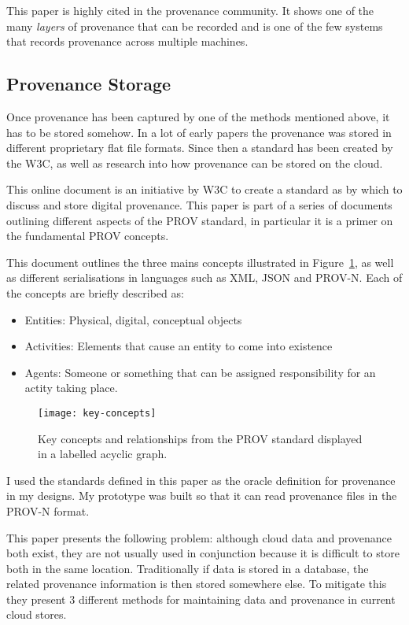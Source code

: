This paper is highly cited in the provenance community. It shows one of the many \textit{layers} of provenance that can be recorded and is one of the few systems that records provenance across multiple machines. 

\subsection{Provenance Storage}
\label{sec:provenance_storage}

Once provenance has been captured by one of the methods mentioned above, it has to be stored somehow. In a lot of early papers the provenance was stored in different proprietary flat file formats. Since then a standard has been created by the W3C, as well as research into how provenance can be stored on the cloud.

This online document is an initiative by W3C to create a standard as by which to discuss and store digital provenance. This paper is part of a series of documents outlining different aspects of the PROV standard, in particular it is a primer on the fundamental PROV concepts.

This document outlines the three mains concepts illustrated in Figure~\ref{fig:key-concepts}, as well as different serialisations in languages such as XML, JSON and PROV-N. Each of the concepts are briefly described as:
\begin{itemize}
	\item Entities: Physical, digital, conceptual objects
	\item Activities: Elements that cause an entity to come into existence
	\item Agents: Someone or something that can be assigned responsibility for an actity taking place.  
\end{itemize}

\begin{figure}[h]
	\centering
	\texttt{[image: key-concepts]}
	\caption{Key concepts and relationships from the PROV standard displayed in a labelled acyclic graph.}
	\label{fig:key-concepts}
\end{figure}

I used the standards defined in this paper as the oracle definition for provenance in my designs. My prototype was built so that it can read provenance files in the PROV-N format.

This paper presents the following problem: although cloud data and provenance both exist, they are not usually used in conjunction because it is difficult to store both in the same location. Traditionally if data is stored in a database, the related provenance information is then stored somewhere else. To mitigate this they present 3 different methods for maintaining data and provenance in current cloud stores.

